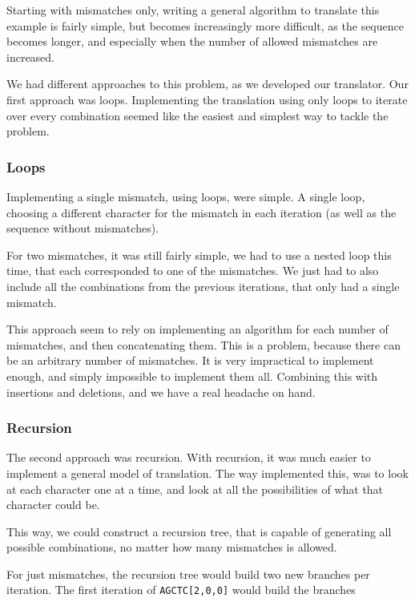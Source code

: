 \documentclass[12pt]{article}
\begin{document}
Starting with mismatches only, writing a general algorithm to translate this example is fairly simple, but becomes increasingly more difficult, as the sequence becomes longer, and especially when the number of allowed mismatches are increased.

We had different approaches to this problem, as we developed our translator. Our first approach was loops. Implementing the translation using only loops to iterate over every combination seemed like the easiest and simplest way to tackle the problem.

\subsubsection{Loops}

Implementing a single mismatch, using loops, were simple. A single loop, choosing a different character for the mismatch in each iteration (as well as the sequence without mismatches).

For two mismatches, it was still fairly simple, we had to use a nested loop this time, that each corresponded to one of the mismatches. We just had to also include all the combinations from the previous iterations, that only had a single mismatch.

This approach seem to rely on implementing an algorithm for each number of mismatches, and then concatenating them. This is a problem, because there can be an arbitrary number of mismatches. It is very impractical to implement enough, and simply impossible to implement them all. Combining this with insertions and deletions, and we have a real headache on hand.

\subsubsection{Recursion}

The second approach was recursion. With recursion, it was much easier to implement a general model of translation. The way implemented this, was to look at each character one at a time, and look at all the possibilities of what that character could be.

This way, we could construct a recursion tree, that is capable of generating all possible combinations, no matter how many mismatches is allowed.

For just mismatches, the recursion tree would build two new branches per iteration. The first iteration of \texttt{AGCTC[2,0,0]} would build the branches
\end{document}
